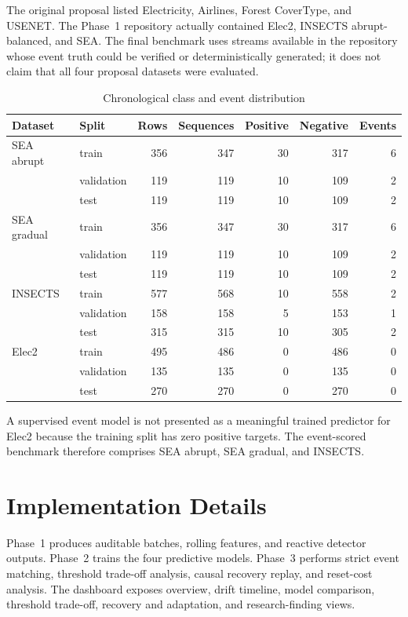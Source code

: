 \documentclass[10pt,twocolumn]{article}
\begin{document}
The original proposal listed Electricity, Airlines, Forest CoverType, and USENET. The Phase~1 repository actually contained Elec2, INSECTS abrupt-balanced, and SEA. The final benchmark uses streams available in the repository whose event truth could be verified or deterministically generated; it does not claim that all four proposal datasets were evaluated.

\begin{table}[t]
\caption{Chronological class and event distribution}
\centering\small
\begin{tabular}{llrrrrr}
\toprule
Dataset & Split & Rows & Sequences & Positive & Negative & Events \\
\midrule
SEA abrupt & train & 356 & 347 & 30 & 317 & 6 \\
 & validation & 119 & 119 & 10 & 109 & 2 \\
 & test & 119 & 119 & 10 & 109 & 2 \\
SEA gradual & train & 356 & 347 & 30 & 317 & 6 \\
 & validation & 119 & 119 & 10 & 109 & 2 \\
 & test & 119 & 119 & 10 & 109 & 2 \\
INSECTS & train & 577 & 568 & 10 & 558 & 2 \\
 & validation & 158 & 158 & 5 & 153 & 1 \\
 & test & 315 & 315 & 10 & 305 & 2 \\
Elec2 & train & 495 & 486 & 0 & 486 & 0 \\
 & validation & 135 & 135 & 0 & 135 & 0 \\
 & test & 270 & 270 & 0 & 270 & 0 \\
\bottomrule
\end{tabular}
\label{tab:dist}
\end{table}

A supervised event model is not presented as a meaningful trained predictor for Elec2 because the training split has zero positive targets. The event-scored benchmark therefore comprises SEA abrupt, SEA gradual, and INSECTS.

\section{Implementation Details}
Phase~1 produces auditable batches, rolling features, and reactive detector outputs. Phase~2 trains the four predictive models. Phase~3 performs strict event matching, threshold trade-off analysis, causal recovery replay, and reset-cost analysis. The dashboard exposes overview, drift timeline, model comparison, threshold trade-off, recovery and adaptation, and research-finding views.
\end{document}

